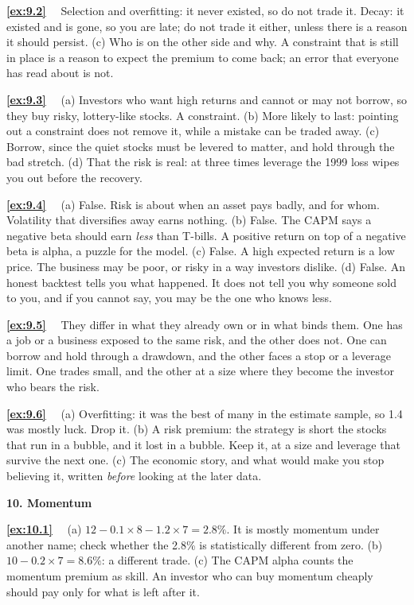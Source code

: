 \documentclass[11pt]{article}
\newcounter{ex}[section]
\newcommand{\sol}[1]{\par\smallskip\textbf{\ref{#1}}\ \ }
\newcommand{\head}[1]{\par\medskip\textbf{#1}\par}
\begin{document}
{\sol{ex:9.2} Selection and overfitting: it never existed, so do not trade it. Decay: it existed and is gone, so you are
late; do not trade it either, unless there is a reason it should persist. (c) Who is on the other side and why. A
constraint that is still in place is a reason to expect the premium to come back; an error that everyone has read
about is not.

\sol{ex:9.3} (a) Investors who want high returns and cannot or may not borrow, so they buy risky, lottery-like stocks.
A constraint. (b) More likely to last: pointing out a constraint does not remove it, while a mistake can be traded
away. (c) Borrow, since the quiet stocks must be levered to matter, and hold through the bad stretch. (d) That the risk
is real: at three times leverage the 1999 loss wipes you out before the recovery.

\sol{ex:9.4} (a) False. Risk is about when an asset pays badly, and for whom. Volatility that diversifies away earns
nothing. (b) False. The CAPM says a negative beta should earn \emph{less} than T-bills. A positive return on top of a
negative beta is alpha, a puzzle for the model. (c) False. A high expected return is a low price. The business may be
poor, or risky in a way investors dislike. (d) False. An honest backtest tells you what happened. It does not tell you
why someone sold to you, and if you cannot say, you may be the one who knows less.

\sol{ex:9.5} They differ in what they already own or in what binds them. One has a job or a business exposed to the
same risk, and the other does not. One can borrow and hold through a drawdown, and the other faces a stop or a
leverage limit. One trades small, and the other at a size where they become the investor who bears the risk.

\sol{ex:9.6} (a) Overfitting: it was the best of many in the estimate sample, so 1.4 was mostly luck. Drop it. (b) A risk
premium: the strategy is short the stocks that run in a bubble, and it lost in a bubble. Keep it, at a size and
leverage that survive the next one. (c) The economic story, and what would make you stop believing it, written
\emph{before} looking at the later data.

\head{10. Momentum}

\sol{ex:10.1} (a) $12 - 0.1\times 8 - 1.2\times 7 = 2.8\%$. It is mostly momentum under another name; check whether the 2.8\%
is statistically different from zero. (b) $10 - 0.2\times 7 = 8.6\%$: a different trade. (c) The CAPM alpha counts the
momentum premium as skill. An investor who can buy momentum cheaply should pay only for what is left after it.

}
\end{document}
